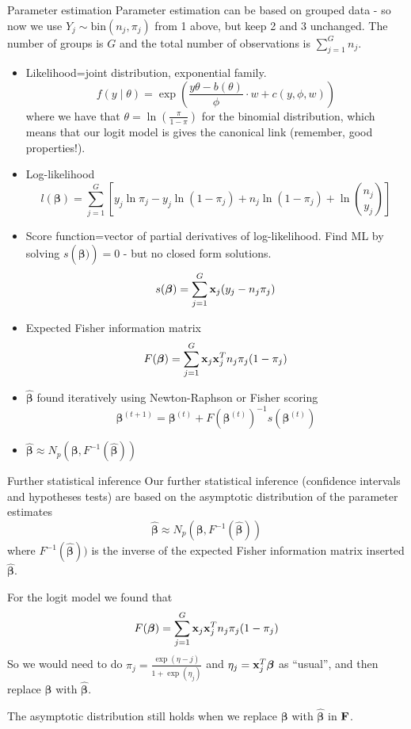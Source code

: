 \documentclass[
  ignorenonframetext,
]{beamer}
\begin{document}
\begin{frame}{Parameter estimation}
\protect\hypertarget{parameter-estimation}{}
Parameter estimation can be based on grouped data - so now we use
\(Y_j \sim \text{bin}(n_j,\pi_j)\) from 1 above, but keep 2 and 3
unchanged. The number of groups is \(G\) and the total number of
observations is \(\sum_{j=1}^G n_j\).

\begin{itemize}
\item
  Likelihood=joint distribution, exponential family.
  \[ f(y\mid \theta)=\exp \left( \frac{y \theta-b(\theta)}{\phi}\cdot w + c(y, \phi, w) \right) \]
  where we have that \(\theta=\ln(\frac{\pi}{1-\pi})\) for the binomial
  distribution, which means that our logit model is gives the canonical
  link (remember, good properties!).
\item
  Log-likelihood
  \[l(\boldsymbol{\beta})=\sum_{j=1}^G[y_j \ln \pi_j-y_j\ln(1-\pi_j)+n_j\ln(1-\pi_j)+ \ln {n_j \choose y_j}]\]
\end{itemize}
\end{frame}

\begin{frame}
\begin{itemize}
\item
  Score function=vector of partial derivatives of log-likelihood. Find
  ML by solving \(s(\hat{\boldsymbol{\beta})})=0\) - but no closed form
  solutions.
  \[s(\boldsymbol{\beta})=\sum_{j=1}^G {\bf x}_j (y_j-n_j\pi_j)\]
\item
  Expected Fisher information matrix
  \[F(\boldsymbol{\beta})=\sum_{j=1}^G {\bf x}_j {\bf x}_j^T n_j \pi_j (1-\pi_j)\]
\item
  \(\hat{\boldsymbol{\beta}}\) found iteratively using Newton-Raphson or
  Fisher scoring
  \[\boldsymbol{\beta}^{(t+1)}=\boldsymbol{\beta}^{(t)} + F(\boldsymbol{\beta}^{(t)})^{-1} s(\boldsymbol{\beta}^{(t)})\]
\item
  \(\hat{\boldsymbol{\beta}} \approx N_p(\boldsymbol{\beta},F^{-1}(\hat{\boldsymbol{\beta}}))\)
\end{itemize}
\end{frame}

\begin{frame}{Further statistical inference}
\protect\hypertarget{further-statistical-inference}{}
Our further statistical inference (confidence intervals and hypotheses
tests) are based on the asymptotic distribution of the parameter
estimates
\[\hat{\boldsymbol{\beta}} \approx N_p(\boldsymbol{\beta},F^{-1}(\hat{\boldsymbol{\beta}}))\]
where \(F^{-1}(\hat{\boldsymbol{\beta}}))\) is the inverse of the
expected Fisher information matrix inserted
\(\hat{\boldsymbol{\beta}}\).

For the logit model we found that
\[F(\boldsymbol{\beta})=\sum_{j=1}^G {\bf x}_j {\bf x}_j^T n_j \pi_j (1-\pi_j)\]
So we would need to do \(\pi_j=\frac{\exp(\eta-j)}{1+\exp(\eta_j)}\) and
\(\eta_j={\bf x}_j^T\boldsymbol{\beta}\) as ``usual'', and then replace
\(\boldsymbol{\beta}\) with \(\hat{\boldsymbol{\beta}}\).

The asymptotic distribution still holds when we replace
\(\boldsymbol{\beta}\) with \(\hat{\boldsymbol{\beta}}\) in \({\bf F}\).
\end{frame}
\end{document}
